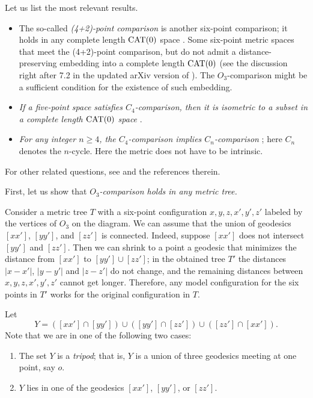 \documentclass{article}
\begin{document}
Let us list the most relevant results.
\begin{itemize}
\item The so-called \emph{(4+2)-point comparison} is another six-point comparison;
it holds in any complete length $\mathrm{CAT}(0)$ space \cite{alexander-kapovitch-petrunin2011,alexander-kapovitch-petrunin2022}.
Some six-point metric spaces that meet the (4+2)-point comparison, but do not admit a distance-preserving embedding into a complete length $\mathrm{CAT}(0)$
(see the discussion right after 7.2 in the updated arXiv version of \cite{alexander-kapovitch-petrunin2011}).
The $O_3$-comparison might be a sufficient condition for the existence of such embedding.

\item \textit{If a five-point space satisfies $C_4$-comparison, then it is isometric to a subset in a complete length $\mathrm{CAT}(0)$ space} \cite{toyoda2020,lebedeva-petrunin2021}.

\item \textit{For any integer $n\ge 4$, the $C_4$-comparison implies $C_n$-comparison} \cite{toyoda2023};
here $C_n$ denotes the $n$-cycle.
Here the metric does not have to be intrinsic. 
\end{itemize}
For other related questions, see \cite{gromov2001,gromov2007,petrunin2017,lebedeva,lebedeva-petrunin2010,lebedeva-petrunin2021,lebedeva-petrunin2022,lebedeva-petrunin2023,lebedeva-petrunin-zolotov, foertsch-lytchak-schroeder,eskenazis-mendel-naor,noar,toyoda2020,toyoda2023} and the references therein.

\bigskip

First, let us show that \textit{$O_3$-comparison holds in any metric tree.}

Consider a metric tree $T$ with a six-point configuration $x,y,z,x',y',z'$ labeled by the vertices of $O_3$ on the diagram.
We can assume that the union of geodesics $[xx']$, $[yy']$, and $[zz']$ is connected.
Indeed, suppose $[xx']$ does not intersect $[yy']$ and $[zz']$.
Then we can shrink to a point a geodesic that minimizes the distance from $[xx']$ to $[yy']\cup[zz']$;
in the obtained tree $T'$ the distances $|x-x'|$, $|y-y'|$ and $|z-z'|$ do not change, and the remaining distances between $x,y,z,x',y',z'$ cannot get longer.
Therefore, any model configuration for the six points in $T'$ works for the original configuration in $T$.

Let 
\[Y=([xx']\cap [yy'])\cup([yy']\cap [zz'])\cup([zz']\cap [xx']).\]
Note that we are in one of the following two cases:
\begin{enumerate}
\item The set $Y$ is a \emph{tripod}; that is, $Y$ is a union of three geodesics meeting at one point, say $o$.
\item $Y$ lies in one of the  geodesics $[xx']$, $[yy']$, or $[zz']$.
\end{enumerate}
\end{document}
